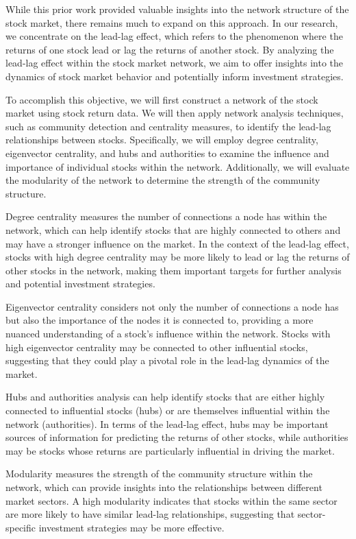 \documentclass{article}
\begin{document}
While this prior work provided valuable insights into the network structure of the stock market, there remains much to expand on this approach. In our research, we  concentrate on the lead-lag effect, which refers to the phenomenon where the returns of one stock lead or lag the returns of another stock. By analyzing the lead-lag effect within the stock market network, we aim to offer insights into the dynamics of stock market behavior and potentially inform investment strategies.

To accomplish this objective, we will first construct a network of the stock market using stock return data.  We will then apply network analysis techniques, such as community detection and centrality measures, to identify the lead-lag relationships between stocks. Specifically, we will employ degree centrality, eigenvector centrality, and hubs and authorities to examine the influence and importance of individual stocks within the network. Additionally, we will evaluate the modularity of the network to determine the strength of the community structure.

Degree centrality measures the number of connections a node has within the network, which can help identify stocks that are highly connected to others and may have a stronger influence on the market. In the context of the lead-lag effect, stocks with high degree centrality may be more likely to lead or lag the returns of other stocks in the network, making them important targets for further analysis and potential investment strategies.

Eigenvector centrality considers not only the number of connections a node has but also the importance of the nodes it is connected to, providing a more nuanced understanding of a stock's influence within the network. Stocks with high eigenvector centrality may be connected to other influential stocks, suggesting that they could play a pivotal role in the lead-lag dynamics of the market.

Hubs and authorities analysis can help identify stocks that are either highly connected to influential stocks (hubs) or are themselves influential within the network (authorities). In terms of the lead-lag effect, hubs may be important sources of information for predicting the returns of other stocks, while authorities may be stocks whose returns are particularly influential in driving the market.

Modularity measures the strength of the community structure within the network, which can provide insights into the relationships between different market sectors. A high modularity indicates that stocks within the same sector are more likely to have similar lead-lag relationships, suggesting that sector-specific investment strategies may be more effective.
\end{document}
